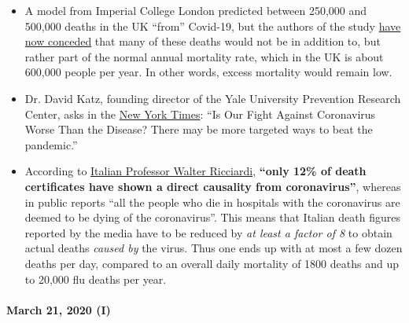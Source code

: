 \begin{itemize}
\tightlist
\item
  A model from Imperial College London predicted between 250,000 and
  500,000 deaths in the UK ``from'' Covid-19, but the authors of the
  study \href{https://www.bbc.com/news/health-51979654}{have now
  conceded} that many of these deaths would not be in addition to, but
  rather part of the normal annual mortality rate, which in the UK is
  about 600,000 people per year. In other words, excess mortality would
  remain low.
\item
  Dr. David Katz, founding director of the Yale University Prevention
  Research Center, asks in the
  \href{https://www.nytimes.com/2020/03/20/opinion/coronavirus-pandemic-social-distancing.html}{New
  York Times}: ``Is Our Fight Against Coronavirus Worse Than the
  Disease? There may be more targeted ways to beat the pandemic.''
\item
  According to
  \href{https://web.archive.org/web/20200324214448/https://www.telegraph.co.uk/global-health/science-and-disease/have-many-coronavirus-patients-died-italy/}{Italian
  Professor Walter Ricciardi}, \textbf{``only 12\% of death certificates
  have shown a direct causality from coronavirus''}, whereas in public
  reports ``all the people who die in hospitals with the coronavirus are
  deemed to be dying of the coronavirus''. This means that Italian death
  figures reported by the media have to be reduced by \emph{at least a
  factor of 8} to obtain actual deaths \emph{caused by} the virus. Thus
  one ends up with at most a few dozen deaths per day, compared to an
  overall daily mortality of 1800 deaths and up to 20,000 flu deaths per
  year.
\end{itemize}

\hypertarget{march-21-2020-i}{%
\paragraph{March 21, 2020 (I)}\label{march-21-2020-i}}

